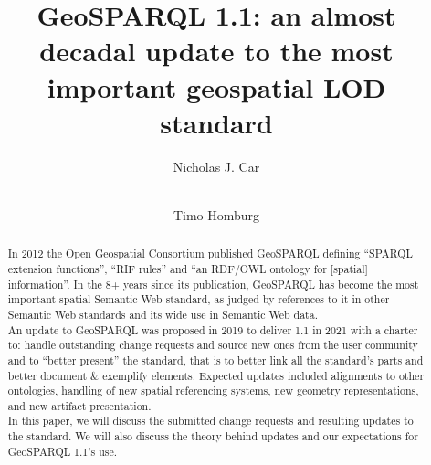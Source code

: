 \documentclass[runningheads]{llncs}
\begin{document}
\title{GeoSPARQL 1.1: an almost decadal update to the most important geospatial LOD standard}

\author{
    Nicholas J. Car \and \\
    Timo Homburg
}



\maketitle

\begin{abstract}
In 2012 the Open Geospatial Consortium published GeoSPARQL 
defining ``SPARQL extension functions'', ``RIF rules'' and ``an RDF/OWL ontology for [spatial] information''.
In the 8+ years since its publication, GeoSPARQL has become the most important spatial Semantic 
Web standard, as judged by references to it in other Semantic Web standards and its wide use in 
Semantic Web data.\\

An update to GeoSPARQL was proposed in 2019 to deliver  1.1 in 2021 with a charter to: 
handle outstanding change requests and source new ones from the user community and 
to ``better present'' the standard, that is to better link all the standard’s parts and better 
document \& exemplify elements. Expected updates included alignments to other ontologies, 
handling of new spatial referencing systems, new geometry representations, and new artifact 
presentation.\\

In this paper, we will discuss the submitted change requests and resulting updates to the standard. 
We will also discuss the theory behind updates and our expectations for GeoSPARQL 1.1's use.

\end{abstract}
\end{document}

